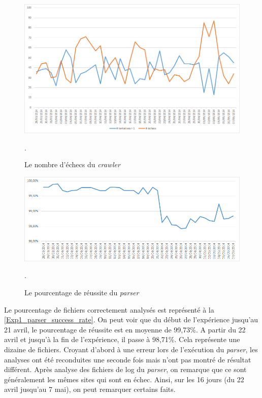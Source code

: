 \begin{figure}[h]
	\centering
	\includegraphics[scale=.7]{graphiques/Exp1_crawler_fails.png}
	\caption{\label{Exp1_crawler_fails}Le nombre d'échecs du \textit{crawler}}.
\end{figure}

\begin{figure}[h]
	\centering
	\includegraphics[scale=.8]{graphiques/Exp1_parser_success_rate.png}
	\caption{\label{Exp1_parser_success_rate}Le pourcentage de réussite du \textit{parser}}.
\end{figure}

Le pourcentage de fichiers correctement analysés est représenté à la \autoref{Exp1_parser_success_rate}. On peut voir que du début de l'expérience jusqu'au 21 avril, le pourcentage de réussite est en moyenne de 99,73\%. A partir du 22 avril et jusqu'à la fin de l'expérience, il passe à 98,71\%. Cela représente une dizaine de fichiers.
Croyant d'abord à une erreur lors de l'exécution du \textit{parser}, les analyses ont été reconduites une seconde fois mais n'ont pas montré de résultat différent.
Après analyse des fichiers de log du \textit{parser}, on remarque que ce sont généralement les mêmes sites qui sont en échec.
Ainsi, sur les 16 jours (du 22 avril jusqu'au 7 mai), on peut remarquer certains faits.
\newline

